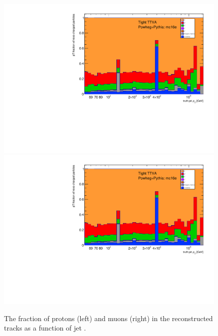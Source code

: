 \begin{figure}
\centering
\includegraphics[scale=0.3, page=6]{figures/jet_comp_study_powheg_Tight_pTFraction_mc16e.pdf}
\includegraphics[scale=0.3, page=7]{figures/jet_comp_study_powheg_Tight_pTFraction_mc16e.pdf}
\caption {The fraction of protons (left) and muons (right) in the reconstructed tracks as a function of jet \pT.}
\label{fig:response protons and muons}
\end{figure}



